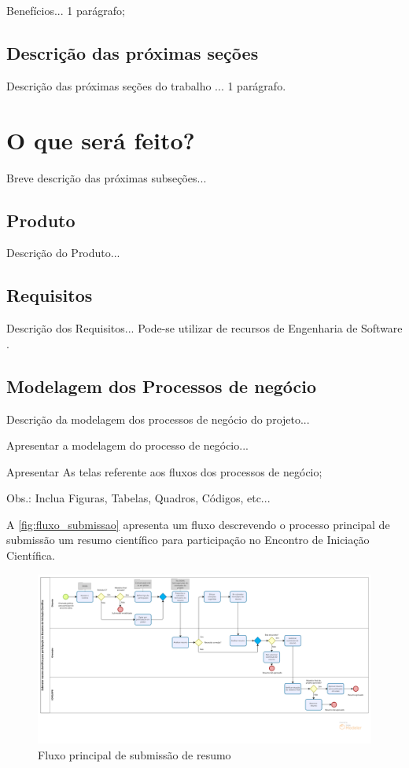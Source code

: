 \documentclass[12pt]{article}
\begin{document}
Benefícios... 1 parágrafo;

\subsection{Descrição das próximas seções} 
Descrição das próximas seções do trabalho ... 1 parágrafo.


\section{O que será feito? } \label{sec:oque}

Breve descrição das próximas subseções...

\subsection{Produto}

Descrição do Produto...

\subsection{Requisitos}

Descrição dos Requisitos...
Pode-se utilizar de recursos de Engenharia de Software \cite{pressman2021engenharia}.

\subsection{Modelagem dos Processos de negócio }

Descrição da modelagem dos processos de negócio do projeto...

Apresentar a modelagem do processo de negócio...


Apresentar As telas referente aos fluxos dos processos de negócio;

Obs.: Inclua Figuras, Tabelas, Quadros, Códigos, etc...


A \autoref{fig:fluxo_submissao} apresenta um fluxo descrevendo o processo principal de submissão um resumo científico para participação no Encontro de Iniciação Científica.

\begin{figure}[!htb]
\caption{Fluxo principal de submissão de resumo}
\label{fig:fluxo_submissao}
\centering
\includegraphics[width=12cm]{images/submeter-resumo-cientifico.png}
\end{figure}
\end{document}

